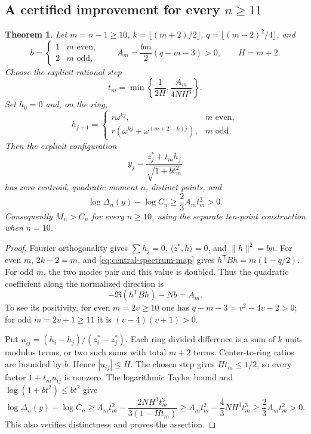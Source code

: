 \documentclass[11pt]{article}
\newtheorem{theorem}{Theorem}[section]
\theoremstyle{remark}
\numberwithin{equation}{section}
\begin{document}
\subsection{A certified improvement for every \texorpdfstring{$n\ge11$}{n >= 11}}
\begin{theorem}\label{thm:all-n-improvement}
Let $m=n-1\ge10$, $k=\lfloor(m+2)/2\rfloor$,
$q=\lfloor(m-2)^2/4\rfloor$, and
\[
 b=\begin{cases}1&m\text{ even},\\2&m\text{ odd},\end{cases}
 \qquad A_m=\frac{bm}{2}(q-m-3)>0,\qquad H=m+2.
\]
Choose the explicit rational step
\[
 t_m=\min\left\{\frac1{2H},\frac{A_m}{4NH^3}\right\}.
\]
Set $h_0=0$ and, on the ring,
\[
 h_{j+1}=\begin{cases}
 r\omega^{kj},&m\text{ even},\\
 r(\omega^{kj}+\omega^{(m+2-k)j}),&m\text{ odd}.
 \end{cases}
\]
Then the explicit configuration
\[
 y_j=\frac{z_j^*+t_mh_j}{\sqrt{1+bt_m^2}}
\]
has zero centroid, quadratic moment $n$, distinct points, and
\begin{equation}\label{eq:all-n-strict-gain}
 \log\Delta_n(y)-\log C_n\ge\frac23 A_m t_m^2>0.
\end{equation}
Consequently $M_n>C_n$ for every $n\ge10$, using the separate
ten-point construction when $n=10$.
\end{theorem}
\begin{proof}
Fourier orthogonality gives $\sum h_j=0$,
$\langle z^*,h\rangle=0$, and $\|h\|^2=bn$.
For even $m$, $2k-2=m$, and \eqref{eq:central-spectrum-map} gives
$h^{\mathsf T}Bh=m(1-q/2)$.
For odd $m$, the two modes pair and this value is doubled.
Thus the quadratic coefficient along the normalized direction is
\[
 -\Re(h^{\mathsf T}Bh)-Nb=A_m.
\]
To see its positivity, for even $m=2v\ge10$ one has
$q-m-3=v^2-4v-2>0$; for odd $m=2v+1\ge11$ it is
$(v-4)(v+1)>0$.

Put $u_{ij}=(h_i-h_j)/(z_i^*-z_j^*)$.
Each ring divided difference is a sum of $k$ unit-modulus terms,
or two such sums with total $m+2$ terms. Center-to-ring ratios
are bounded by $b$. Hence $|u_{ij}|\le H$.
The chosen step gives $Ht_m\le1/2$, so every factor
$1+t_mu_{ij}$ is nonzero.
The logarithmic Taylor bound and $\log(1+bt^2)\le bt^2$ give
\[
 \log\Delta_n(y)-\log C_n
 \ge A_mt_m^2-\frac{2NH^3t_m^3}{3(1-Ht_m)}
 \ge A_mt_m^2-\frac43NH^3t_m^3
 \ge\frac23 A_mt_m^2>0.
\]
This also verifies distinctness and proves the assertion.
\end{proof}
\end{document}
